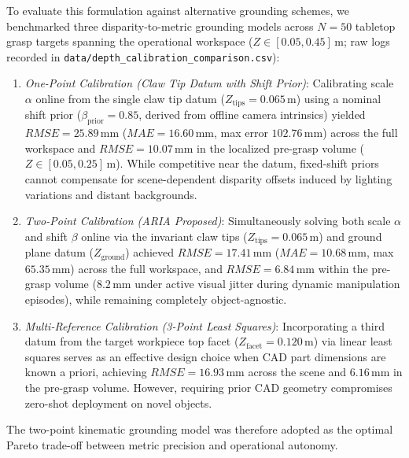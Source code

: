 \documentclass[journal]{IEEEtran}
\begin{document}
To evaluate this formulation against alternative grounding schemes, we benchmarked three disparity-to-metric grounding models across $N=50$ tabletop grasp targets spanning the operational workspace ($Z \in [0.05, 0.45]$\,m; raw logs recorded in \texttt{data/depth\_calibration\_comparison.csv}):
\begin{enumerate}
    \item \textit{One-Point Calibration (Claw Tip Datum with Shift Prior)}: Calibrating scale $\alpha$ online from the single claw tip datum ($Z_{\text{tips}} = 0.065$\,m) using a nominal shift prior ($\beta_{\text{prior}} = 0.85$, derived from offline camera intrinsics) yielded $RMSE = 25.89$\,mm ($MAE = 16.60$\,mm, max error $102.76$\,mm) across the full workspace and $RMSE = 10.07$\,mm in the localized pre-grasp volume ($Z \in [0.05, 0.25]$\,m). While competitive near the datum, fixed-shift priors cannot compensate for scene-dependent disparity offsets induced by lighting variations and distant backgrounds.
    \item \textit{Two-Point Calibration (ARIA Proposed)}: Simultaneously solving both scale $\alpha$ and shift $\beta$ online via the invariant claw tips ($Z_{\text{tips}} = 0.065$\,m) and ground plane datum ($Z_{\text{ground}}$) achieved $RMSE = 17.41$\,mm ($MAE = 10.68$\,mm, max $65.35$\,mm) across the full workspace, and $RMSE = 6.84$\,mm within the pre-grasp volume ($8.2$\,mm under active visual jitter during dynamic manipulation episodes), while remaining completely object-agnostic.
    \item \textit{Multi-Reference Calibration (3-Point Least Squares)}: Incorporating a third datum from the target workpiece top facet ($Z_{\text{facet}} = 0.120$\,m) via linear least squares serves as an effective design choice when CAD part dimensions are known a priori, achieving $RMSE = 16.93$\,mm across the scene and $6.16$\,mm in the pre-grasp volume. However, requiring prior CAD geometry compromises zero-shot deployment on novel objects.
\end{enumerate}
The two-point kinematic grounding model was therefore adopted as the optimal Pareto trade-off between metric precision and operational autonomy.
\end{document}
